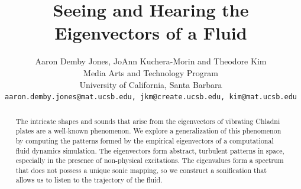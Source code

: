 \documentclass[11pt]{article}
\title{Seeing and Hearing the Eigenvectors of a Fluid}
\author{ Aaron Demby Jones, JoAnn Kuchera-Morin and Theodore Kim\\
Media Arts and Technology Program\\ University of California, Santa Barbara\\
{\tt aaron.demby.jones@mat.ucsb.edu, jkm@create.ucsb.edu, kim@mat.ucsb.edu}
}
\date{}				%
\begin{document}
\newcommand{\UU}{\mathbf{U}}
\newcommand{\uu}{\mathbf{u}}
\newcommand{\vv}{\mathbf{v}}
\newcommand{\utilde}{\mathbf{q}}
\newcommand{\ff}{\mathbf{f}}
\newcommand{\qq}{\mathbf{q}}
\newcommand{\aaa}{\mathbf{a}}
\newcommand{\R}{\mathbb{R}}
\newcommand{\subspace}{\mathbb{S}}
\newcommand{\boldA}{\mathbf{A}}
\newcommand{\VV}{\mathbf{V}}
\newcommand{\todo}[1]{$\spadesuit$ {\bf #1} $\spadesuit$}


\maketitle

\thispagestyle{empty}

\begin{abstract}
The intricate shapes and sounds that arise from the eigenvectors of vibrating Chladni plates are a well-known phenomenon. We explore a generalization of this phenomenon by computing the patterns formed by the empirical eigenvectors of a computational fluid dynamics simulation. The eigenvectors form abstract, turbulent patterns in space, especially in the presence of non-physical excitations. The eigenvalues form a spectrum that does not possess a unique sonic mapping, so we construct a sonification that allows us to listen to the trajectory of the fluid.
\end{abstract}


\end{document}
